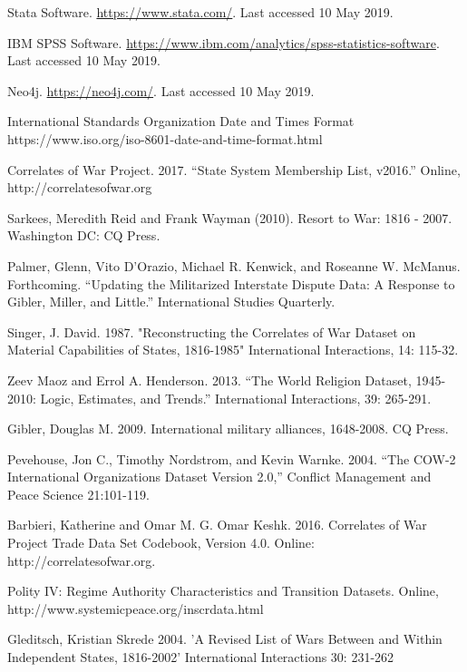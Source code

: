 \documentclass[runningheads]{llncs}
\begin{document}
\begin{thebibliography}{8}\label{bib}
Stata Software. \url{https://www.stata.com/}. Last accessed 10 May 2019.

IBM SPSS Software. \url{https://www.ibm.com/analytics/spss-statistics-software}. Last accessed 10 May 2019.

Neo4j. \url{https://neo4j.com/}. Last accessed 10 May 2019.

International Standards Organization Date and Times Format https://www.iso.org/iso-8601-date-and-time-format.html

Correlates of War Project. 2017. ``State System Membership List, v2016.'' Online, http://correlatesofwar.org

Sarkees, Meredith Reid and Frank Wayman (2010). Resort to War: 1816 - 2007. Washington DC: CQ Press.

Palmer, Glenn, Vito D'Orazio, Michael R. Kenwick, and Roseanne W. McManus. Forthcoming. “Updating the Militarized Interstate Dispute Data: A Response to Gibler, Miller, and Little.” International Studies Quarterly.

Singer, J. David. 1987. "Reconstructing the Correlates of War Dataset on Material Capabilities of States, 1816-1985" International Interactions, 14: 115-32.

Zeev Maoz and Errol A. Henderson. 2013. ``The World Religion Dataset, 1945-2010: Logic, Estimates, and Trends.'' International Interactions, 39: 265-291.

Gibler, Douglas M. 2009. International military alliances, 1648-2008. CQ Press.

Pevehouse, Jon C., Timothy Nordstrom, and Kevin Warnke. 2004. ``The COW-2 International Organizations Dataset Version 2.0,'' Conflict Management and Peace Science 21:101-119.

Barbieri, Katherine and Omar M. G. Omar Keshk. 2016. Correlates of War Project Trade Data Set Codebook, Version 4.0. Online: http://correlatesofwar.org.

Polity IV: Regime Authority Characteristics and Transition Datasets. Online, http://www.systemicpeace.org/inscrdata.html

Gleditsch, Kristian Skrede 2004. 'A Revised List of Wars Between and Within Independent States, 1816-2002' International Interactions 30: 231-262

\end{thebibliography}
\end{document}
